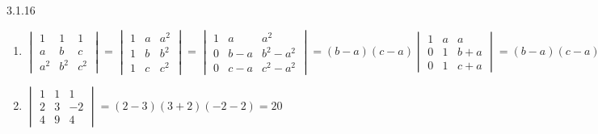 \documentclass{article}
\theoremstyle{definition}
\begin{document}
    \begin{prob}{3.1.16} $  $
    	\begin{enumerate}[label=\alph*.)]
    		\item $ \begin{vmatrix} 1 & 1 & 1 \\ a & b & c \\ a^2 & b^2 & c^2 \end{vmatrix} = \begin{vmatrix} 1 & a & a^2 \\ 1 & b & b^2 \\ 1 & c & c^2 \end{vmatrix} = \begin{vmatrix} 1 & a & a^2 \\ 0 & b-a & b^2-a^2 \\ 0 & c-a & c^2-a^2 \end{vmatrix} = (b-a)(c-a) \begin{vmatrix} 1 & a & a \\ 0 & 1 & b+a \\ 0 & 1 & c+a \end{vmatrix}  = \boxed{(b-a)(c-a)(c-b)} $
    		
    		\item $ \begin{vmatrix} 1 & 1 & 1 \\ 2 & 3 & -2 \\ 4 & 9 & 4 \end{vmatrix} = (2-3)(3+2)(-2-2) = \boxed{20} $
    	\end{enumerate}
    \end{prob}
    
    
    
    
    
    
    
    
    
    
    
    
    
    
    
    
    
    
    
    
    
    
    
    
    
    
    
    
    
    
    
    
    
    
    
    
    
    
    
    
    
    
    
    
    
    
    
    
    
    
    
    
    
\end{document}
